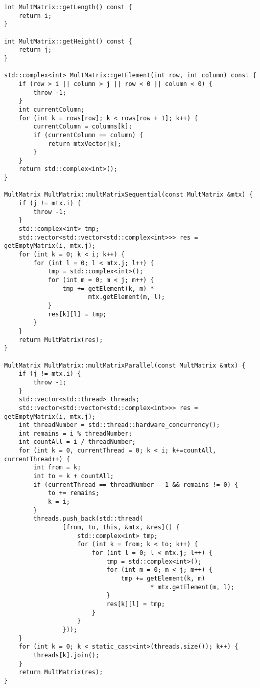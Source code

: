 \documentclass{report}
\begin{document}
\begin{enumerate}
\begin{lstlisting}
int MultMatrix::getLength() const {
    return i;
}

int MultMatrix::getHeight() const {
    return j;
}

std::complex<int> MultMatrix::getElement(int row, int column) const {
    if (row > i || column > j || row < 0 || column < 0) {
        throw -1;
    }
    int currentColumn;
    for (int k = rows[row]; k < rows[row + 1]; k++) {
        currentColumn = columns[k];
        if (currentColumn == column) {
            return mtxVector[k];
        }
    }
    return std::complex<int>();
}

MultMatrix MultMatrix::multMatrixSequential(const MultMatrix &mtx) {
    if (j != mtx.i) {
        throw -1;
    }
    std::complex<int> tmp;
    std::vector<std::vector<std::complex<int>>> res = getEmptyMatrix(i, mtx.j);
    for (int k = 0; k < i; k++) {
        for (int l = 0; l < mtx.j; l++) {
            tmp = std::complex<int>();
            for (int m = 0; m < j; m++) {
                tmp += getElement(k, m) *
                       mtx.getElement(m, l);
            }
            res[k][l] = tmp;
        }
    }
    return MultMatrix(res);
}

MultMatrix MultMatrix::multMatrixParallel(const MultMatrix &mtx) {
    if (j != mtx.i) {
        throw -1;
    }
    std::vector<std::thread> threads;
    std::vector<std::vector<std::complex<int>>> res = getEmptyMatrix(i, mtx.j);
    int threadNumber = std::thread::hardware_concurrency();
    int remains = i % threadNumber;
    int countAll = i / threadNumber;
    for (int k = 0, currentThread = 0; k < i; k+=countAll, currentThread++) {
        int from = k;
        int to = k + countAll;
        if (currentThread == threadNumber - 1 && remains != 0) {
            to += remains;
            k = i;
        }
        threads.push_back(std::thread(
                [from, to, this, &mtx, &res]() {
                    std::complex<int> tmp;
                    for (int k = from; k < to; k++) {
                        for (int l = 0; l < mtx.j; l++) {
                            tmp = std::complex<int>();
                            for (int m = 0; m < j; m++) {
                                tmp += getElement(k, m)
                                        * mtx.getElement(m, l);
                            }
                            res[k][l] = tmp;
                        }
                    }
                }));
    }
    for (int k = 0; k < static_cast<int>(threads.size()); k++) {
        threads[k].join();
    }
    return MultMatrix(res);
}


\end{lstlisting}
\end{enumerate}
\end{document}
